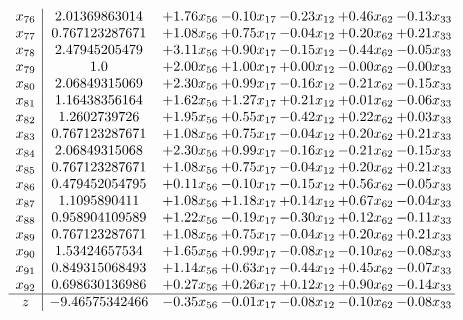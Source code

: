 \documentclass[8pt]{article}
\begin{document}
\[\begin{array}{c| c c@{\hskip 2pt} c@{\hskip 2pt} c@{\hskip 2pt} c@{\hskip 2pt} c@{\hskip 2pt} }
 x_{76}   &  2.01369863014 & +  1.76 x_{56} & -0.10 x_{17} & -0.23 x_{12} & +  0.46 x_{62} & -0.13 x_{33}\\
 x_{77}   &  0.767123287671 & +  1.08 x_{56} & +  0.75 x_{17} & -0.04 x_{12} & +  0.20 x_{62} & +  0.21 x_{33}\\
 x_{78}   &  2.47945205479 & +  3.11 x_{56} & +  0.90 x_{17} & -0.15 x_{12} & -0.44 x_{62} & -0.05 x_{33}\\
 x_{79}   &  1.0 & +  2.00 x_{56} & +  1.00 x_{17} & +  0.00 x_{12} & -0.00 x_{62} & -0.00 x_{33}\\
 x_{80}   &  2.06849315069 & +  2.30 x_{56} & +  0.99 x_{17} & -0.16 x_{12} & -0.21 x_{62} & -0.15 x_{33}\\
 x_{81}   &  1.16438356164 & +  1.62 x_{56} & +  1.27 x_{17} & +  0.21 x_{12} & +  0.01 x_{62} & -0.06 x_{33}\\
 x_{82}   &  1.2602739726 & +  1.95 x_{56} & +  0.55 x_{17} & -0.42 x_{12} & +  0.22 x_{62} & +  0.03 x_{33}\\
 x_{83}   &  0.767123287671 & +  1.08 x_{56} & +  0.75 x_{17} & -0.04 x_{12} & +  0.20 x_{62} & +  0.21 x_{33}\\
 x_{84}   &  2.06849315068 & +  2.30 x_{56} & +  0.99 x_{17} & -0.16 x_{12} & -0.21 x_{62} & -0.15 x_{33}\\
 x_{85}   &  0.767123287671 & +  1.08 x_{56} & +  0.75 x_{17} & -0.04 x_{12} & +  0.20 x_{62} & +  0.21 x_{33}\\
 x_{86}   &  0.479452054795 & +  0.11 x_{56} & -0.10 x_{17} & -0.15 x_{12} & +  0.56 x_{62} & -0.05 x_{33}\\
 x_{87}   &  1.1095890411 & +  1.08 x_{56} & +  1.18 x_{17} & +  0.14 x_{12} & +  0.67 x_{62} & -0.04 x_{33}\\
 x_{88}   &  0.958904109589 & +  1.22 x_{56} & -0.19 x_{17} & -0.30 x_{12} & +  0.12 x_{62} & -0.11 x_{33}\\
 x_{89}   &  0.767123287671 & +  1.08 x_{56} & +  0.75 x_{17} & -0.04 x_{12} & +  0.20 x_{62} & +  0.21 x_{33}\\
 x_{90}   &  1.53424657534 & +  1.65 x_{56} & +  0.99 x_{17} & -0.08 x_{12} & -0.10 x_{62} & -0.08 x_{33}\\
 x_{91}   &  0.849315068493 & +  1.14 x_{56} & +  0.63 x_{17} & -0.44 x_{12} & +  0.45 x_{62} & -0.07 x_{33}\\
 x_{92}   &  0.698630136986 & +  0.27 x_{56} & +  0.26 x_{17} & +  0.12 x_{12} & +  0.90 x_{62} & -0.14 x_{33}\\
\hline
z    &  -9.46575342466 & -0.35 x_{56} & -0.01 x_{17} & -0.08 x_{12} & -0.10 x_{62} & -0.08 x_{33}\\
\end{array}\]
\end{document}
